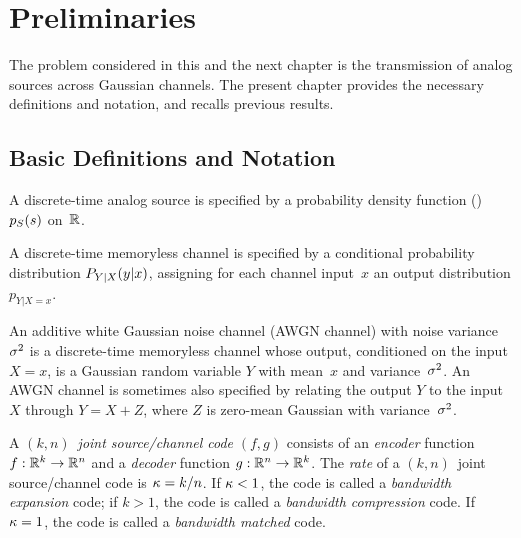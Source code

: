 \chapter{Preliminaries}
\label{ch:prelim}

The problem considered in this and the next chapter is the transmission of
analog sources across Gaussian channels. The present chapter provides the
necessary definitions and notation, and recalls previous results.

\section{Basic Definitions and Notation}
\label{sec:defs}

\begin{definition}[Source]
  \label{def:analogsource}
  A discrete-time analog source is specified by a probability density function
  (\pdf) ${p_S}(s)$ on~$\mathbb{R}$.
\end{definition}

\begin{definition}[Channel]
  \label{def:dtmlc}
  A discrete-time memoryless channel is specified by a conditional probability
  distribution $P_{Y|X}(y|x)$, assigning for each channel input~$x$ an output
  distribution $p_{Y|X=x}$. 
\end{definition}

\begin{definition}
  \label{def:awgn}
  An additive white Gaussian noise channel (AWGN channel) with noise
  variance~${\sigma^2}$ is a discrete-time memoryless channel whose output, conditioned
  on the input $X=x$, is a Gaussian random variable $Y$ with mean~$x$ and
  variance~${\sigma^2}$. An AWGN channel is sometimes also specified by relating the
  output $Y$ to the input $X$ through $Y = X + Z$, where $Z$ is zero-mean
  Gaussian with variance~${\sigma^2}$. 
\end{definition}

\begin{definition}
  \label{def:knsccode}
  A $(k,n)$~\emph{joint source/channel code} $(f,g)$ consists of an
  \emph{encoder} function $f : \mathbb{R}^k \rightarrow \mathbb{R}^n$ and a \emph{decoder}
  function $g:\mathbb{R}^n \rightarrow \mathbb{R}^k$. The \emph{rate} of a $(k,n)$~joint
  source/channel code is $\kappa = k/n$. If $\kappa < 1$, the code is called
  a \emph{bandwidth expansion} code; if $k > 1$, the code is called a
  \emph{bandwidth compression} code. If $\kappa = 1$, the code is called a
  \emph{bandwidth matched} code.
\end{definition}

